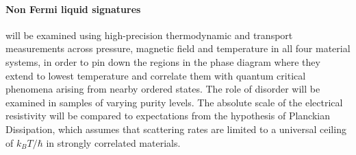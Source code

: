 


%

\paragraph{Non Fermi liquid signatures} will be examined using high-precision thermodynamic and transport measurements across pressure, magnetic field and temperature in all four material systems, in order to pin down the regions in the phase diagram where they extend to lowest temperature and correlate them with quantum critical phenomena arising from nearby ordered states. The role of disorder will be examined in samples of varying purity levels. %
The absolute scale of the electrical resistivity will be compared to expectations from the hypothesis of Planckian Dissipation, which assumes that scattering rates are limited to a universal ceiling of $k_B T/\hbar$ in strongly correlated materials.

